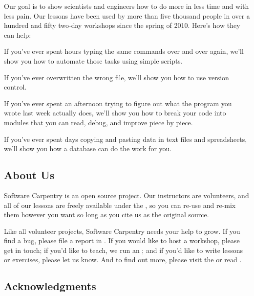 Our goal is to show scientists and engineers how to do more in less
time and with less pain. Our lessons have been used by more than five
thousand people in over a hundred and fifty two-day workshops since
the spring of 2010. Here's how they can help:

\begin{swcitemize}
\item
  If you've ever spent hours typing the same commands over and over
  again, we'll show you how to automate those tasks using simple
  scripts.
\item
  If you've ever overwritten the wrong file, we'll show you how to use
  version control.
\item
  If you've ever spent an afternoon trying to figure out what the
  program you wrote last week actually does, we'll show you how to break
  your code into modules that you can read, debug, and improve piece by
  piece.
\item
  If you've ever spent days copying and pasting data in text files and
  spreadsheets, we'll show you how a database can do the work for you.
\end{swcitemize}

\subsection{About Us}

Software Carpentry is an open source project. Our instructors are
volunteers, and all of our lessons are freely available under the
, so you can re-use and re-mix them however you want
so long as you cite us as the original source.

Like all volunteer projects, Software Carpentry needs your help to grow.
If you find a bug, please file a report in
. If you would
like to host a workshop, please
get in touch; if you'd like
to teach, we run an
; and if you'd like to write lessons or exercises, please
let us know.
And to find out more, please visit the
or read
.

\newpage

\subsection{Acknowledgments}

